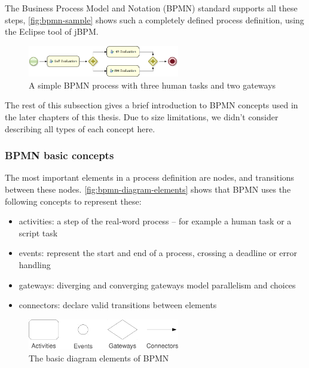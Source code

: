 The Business Process Model and Notation (BPMN) standard \cite{bpmn} supports all
these steps, \autoref{fig:bpmn-sample} shows such a completely defined
process definition, using the Eclipse tool of jBPM.

\begin{figure}[H]
\centering
\includegraphics[width=250px,keepaspectratio]{bpmn-sample.png}
\caption{A simple BPMN process with three human tasks and two gateways}
\label{fig:bpmn-sample}
\end{figure}

The rest of this subsection gives a brief introduction to BPMN concepts used in
the later chapters of this thesis. Due to size limitations, we didn't consider
describing all types of each concept here.

\subsubsection*{BPMN basic concepts}

The most important elements in a process definition are nodes, and transitions
between these nodes. \autoref{fig:bpmn-diagram-elements} shows that BPMN
uses the following concepts to represent these:

\begin{itemize}
\item activities: a step of the real-word process -- for example a human task or a script task
\item events: represent the start and end of a process, crossing a deadline or error handling
\item gateways: diverging and converging gateways model parallelism and choices
\item connectors: declare valid transitions between elements
\end{itemize}

\begin{figure}[H]
\centering
\includegraphics[width=250px,keepaspectratio]{bpmn-diagram-elements.pdf}
\caption{The basic diagram elements of BPMN}
\label{fig:bpmn-diagram-elements}
\end{figure}

